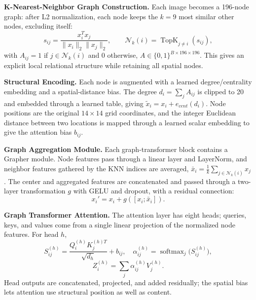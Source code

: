 \documentclass[conference]{IEEEtran}
\begin{document}
\textbf{K-Nearest-Neighbor Graph Construction.} Each image becomes a 196-node graph: after L2 normalization, each node keeps the $k=9$ most similar other nodes, excluding itself:
\begin{equation}
s_{ij} = \frac{x_i^T x_j}{\lVert x_i \rVert_2 \lVert x_j \rVert_2}, \qquad \mathcal{N}_k(i) = \operatorname{TopK}_{j \neq i}(s_{ij}),
\label{eq:knn}
\end{equation}
with $A_{ij}=1$ if $j \in \mathcal{N}_k(i)$ and 0 otherwise, $A \in \{0,1\}^{B \times 196 \times 196}$. This gives an explicit local relational structure while retaining all spatial nodes.

\textbf{Structural Encoding.} Each node is augmented with a learned degree/centrality embedding and a spatial-distance bias. The degree $d_i = \sum_{j} A_{ij}$ is clipped to 20 and embedded through a learned table, giving $\widetilde{x}_i = x_i + e_{cent}(d_i)$.
Node positions are the original $14\times14$ grid coordinates, and the integer Euclidean distance between two locations is mapped through a learned scalar embedding to give the attention bias $b_{ij}$.

\textbf{Graph Aggregation Module.} Each graph-transformer block contains a Grapher module. Node features pass through a linear layer and LayerNorm, and neighbor features gathered by the KNN indices are averaged, $\bar{x}_i = \frac{1}{k} \sum_{j \in \mathcal{N}_k(i)} x_j$.
The center and aggregated features are concatenated and passed through a two-layer transformation $g$ with GELU and dropout, with a residual connection:
\begin{equation}
x_i' = x_i + g([x_i ; \bar{x}_i]).
\label{eq:grapher_residual}
\end{equation}

\textbf{Graph Transformer Attention.} The attention layer has eight heads; queries, keys, and values come from a single linear projection of the normalized node features. For head $h$,
\begin{equation}
S_{ij}^{(h)} = \frac{Q_i^{(h)} K_j^{(h)T}}{\sqrt{d_h}} + b_{ij}, \quad \alpha_{ij}^{(h)} = \operatorname{softmax}_j\big(S_{ij}^{(h)}\big),
\label{eq:attn_score}
\end{equation}
\begin{equation}
Z_i^{(h)} = \textstyle\sum_{j} \alpha_{ij}^{(h)} V_j^{(h)}.
\label{eq:attn_output}
\end{equation}
Head outputs are concatenated, projected, and added residually; the spatial bias lets attention use structural position as well as content.
\end{document}
